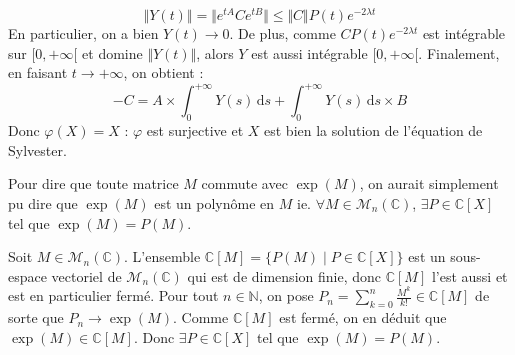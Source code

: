 \begin{demonstration}
		\[ \Vert Y(t) \Vert = \Vert e^{tA} C e^{tB} \Vert \leq \Vert C \Vert P(t) e^{-2 \lambda t} \]
		En particulier, on a bien $Y(t) \longrightarrow 0$. De plus, comme $C P(t) e^{-2 \lambda t}$ est intégrable sur $[0, +\infty[$ et domine $\Vert Y(t) \Vert$, alors $Y$ est aussi intégrable $[0, +\infty[$. Finalement, en faisant $t \longrightarrow +\infty$, on obtient :
		\[ -C = A \times \int_{0}^{+\infty} Y(s) \, \mathrm{d}s + \int_{0}^{+\infty} Y(s) \, \mathrm{d}s \times B \]
		Donc $\varphi(X) = X$ : $\varphi$ est surjective et $X$ est bien la solution de l'équation de Sylvester.
	\end{demonstration}
	
	
	\begin{remark}
		Pour dire que toute matrice $M$ commute avec $\exp(M)$, on aurait simplement pu dire que $\exp(M)$ est un polynôme en $M$ ie. $\forall M \in \mathcal{M}_n(\mathbb{C})$, $\exists P \in \mathbb{C}[X]$ tel que $\exp(M) = P(M)$.
	\end{remark}
	
	\begin{demonstration}
		Soit $M \in \mathcal{M}_n(\mathbb{C})$. L'ensemble $\mathbb{C}[M] = \{ P(M) \mid P \in \mathbb{C}[X] \}$ est un sous-espace vectoriel de $\mathcal{M}_n(\mathbb{C})$ qui est de dimension finie, donc $\mathbb{C}[M]$ l'est aussi et est en particulier fermé.
		\newpar
		Pour tout $n \in \mathbb{N}$, on pose $P_n = \sum_{k=0}^n \frac{M^k}{k!} \in \mathbb{C}[M]$ de sorte que $P_n \longrightarrow \exp(M)$. Comme $\mathbb{C}[M]$ est fermé, on en déduit que $\exp(M) \in \mathbb{C}[M]$. Donc $\exists P \in \mathbb{C}[X]$ tel que $\exp(M) = P(M)$.
	\end{demonstration}
